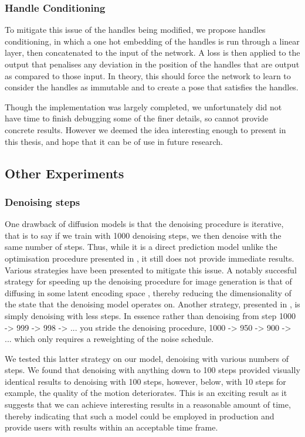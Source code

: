 \subsubsection{Handle Conditioning}
To mitigate this issue of the handles being modified, we propose handles conditioning, in which a one hot embedding of the handles is run through a linear layer, then concatenated to the input of the network. A loss is then applied to the output that penalises any deviation in the position of the handles that are output as compared to those input. In theory, this should force the network to learn to consider the handles as immutable and to create a pose that satisfies the handles.

Though the implementation was largely completed, we unfortunately did not have time to finish debugging some of the finer details, so cannot provide concrete results. However we deemed the idea interesting enough to present in this thesis, and hope that it can be of use in future research.


\subsection{Other Experiments}
\subsubsection{Denoising steps}
One drawback of diffusion models is that the denoising procedure is iterative, that is to say if we train with 1000 denoising steps, we then denoise with the same number of steps. Thus, while it is a direct prediction model unlike the optimisation procedure presented in , it still does not provide immediate results. Various strategies have been presented to mitigate this issue. A notably succesful strategy for speeding up the denoising procedure for image generation is that of diffusing in some latent encoding space \cite{stable_diffusion}, thereby reducing the dimensionality of the state that the denoising model operates on. Another strategy, presented in \cite{improved_diffusion}, is simply denoising with less steps. In essence rather than denoising from step 1000 -> 999 -> 998 -> ... you stride the denoising procedure, 1000 -> 950 -> 900 -> ... which only requires a reweighting of the noise schedule. 

We tested this latter strategy on our model, denoising with various numbers of steps. We found that denoising with anything down to 100 steps provided visually identical results to denoising with 100 steps, however, below, with 10 steps for example, the quality of the motion deteriorates. This is an exciting result as it suggests that we can achieve interesting results in a reasonable amount of time, thereby indicating that such a model could be employed in production and provide users with results within an acceptable time frame.

